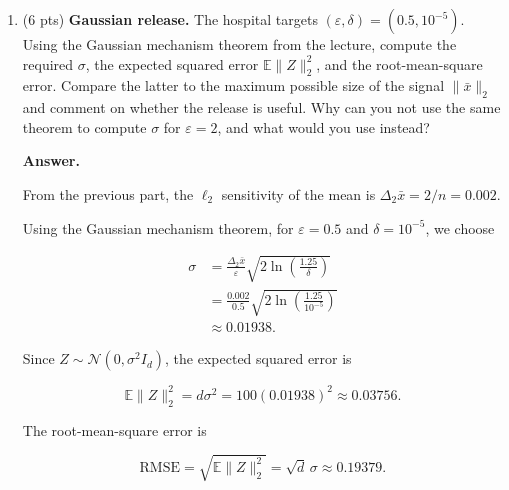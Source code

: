 \documentclass[11pt]{article}
\newcommand{\E}{\mathbb{E}}
\newcommand{\eps}{\varepsilon}
\newenvironment{answer}{\par\medskip\noindent\textbf{Answer.}\ }{\par\bigskip}
\begin{document}
\begin{enumerate}
\begin{answer}
To show tightness, choose

\[
x_i=\frac{1}{\sqrt d}(1,\ldots,1),
\qquad
x_i'=-\frac{1}{\sqrt d}(1,\ldots,1).
\]

Both satisfy $\|x_i\|_2=\|x_i'\|_2=1$,
and

\[
\begin{aligned}
\|\bar{x}(D)-\bar{x}(D')\|_1
&=\frac{1}{n}\|x_i-x_i'\|_1\\
&=\frac{1}{n}\cdot
d\frac{2}{\sqrt d}\\
&=\frac{2\sqrt d}{n}.
\end{aligned}
\]

Hence the bound is tight, and

\[
\boxed{
\Delta_1\bar{x}
=\frac{2\sqrt d}{n}
=\frac{2\sqrt{100}}{1000}
=0.02.
}
\]

\end{answer}

\item (6 pts) \textbf{Gaussian release.} The hospital targets
$(\eps,\delta)=(0.5,10^{-5})$. Using the Gaussian mechanism theorem from the
lecture, compute the required $\sigma$, the expected squared error
$\E\|Z\|_2^2$, and the root-mean-square error. Compare the latter to the
maximum possible size of the signal $\|\bar{x}\|_2$ and comment on whether the
release is useful. Why can you not use the same theorem to compute $\sigma$
for $\eps=2$, and what would you use instead?

\begin{answer}

From the previous part, the $\ell_2$ sensitivity
of the mean is $\Delta_2\bar{x}=2/n=0.002$.

Using the Gaussian mechanism theorem,
for $\eps=0.5$ and $\delta=10^{-5}$,
we choose

\[
\begin{aligned}
\sigma
&=\frac{\Delta_2\bar{x}}{\eps}
\sqrt{2\ln\left(\frac{1.25}{\delta}\right)}\\
&=\frac{0.002}{0.5}
\sqrt{2\ln\left(\frac{1.25}{10^{-5}}\right)}\\
&\approx 0.01938.
\end{aligned}
\]

Since $Z\sim\mathcal{N}(0,\sigma^2 I_d)$,
the expected squared error is

\[
\mathbb{E}\|Z\|_2^2
=d\sigma^2
=100(0.01938)^2
\approx 0.03756.
\]

The root-mean-square error is

\[
\mathrm{RMSE}
=\sqrt{\mathbb{E}\|Z\|_2^2}
=\sqrt{d}\,\sigma
\approx 0.19379.
\]


\end{answer}
\end{enumerate}
\end{document}
